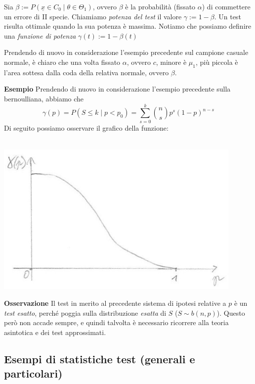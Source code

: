 \begin{definizione} Sia $\beta := P(\underline{x} \in C_0 \mid \theta \in \Theta_1)$, ovvero $\beta$ è la probabilità (fissato $\alpha$) di commettere un errore di II specie. Chiamiamo \textit{potenza del test} il valore $\gamma := 1-\beta$. Un test risulta ottimale quando la sua potenza è massima. Notiamo che possiamo definire una \textit{funzione di potenza} $\gamma(t) := 1-\beta(t)$
\end{definizione}
\begin{oss} Prendendo di nuovo in considerazione l'esempio precedente sul campione casuale normale, è chiaro che una volta fissato $\alpha$, ovvero $c$, minore è $\mu_1$, più piccola è l'area sottesa dalla coda della relativa normale, ovvero $\beta$.
\end{oss}
\noindent \textbf{Esempio} Prendendo di nuovo in considerazione l'esempio precedente sulla bernoulliana, abbiamo che 
			$$\gamma(p) = P(S \leq k \mid p<p_0) = \displaystyle \sum_{s=0}^k \binom{n}{s} p^s (1-p)^{n-s}$$
Di seguito possiamo osservare il grafico della funzione:\\
\\
\begin{center}
\includegraphics [width=12cm] {immagini/grafico_3.jpg}
\end{center}
\textbf{Osservazione} Il test in merito al precedente sistema di ipotesi relative a $p$ è un \textit{test esatto}, perché poggia sulla distribuzione \textit{esatta} di $S$ ($S \sim b(n,p)$). Questo però non accade sempre, e quindi talvolta è necessario ricorrere alla teoria asintotica e dei test approssimati.\\


\subsection{Esempi di statistiche test (generali e particolari)}

